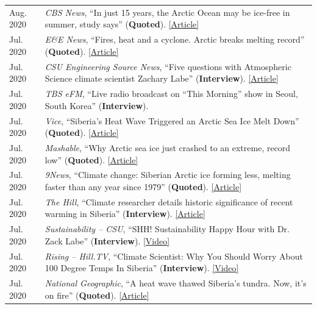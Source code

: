 \documentclass[margin,line,palatino,courier,10pt]{res}
\begin{document}
\begin{resume}
\begin{tabular}{@{}p{0.9in}p{4in}}
Aug. 2020 & \textit{CBS News}, ``In just 15 years, the Arctic Ocean may be ice-free in summer, study says'' (\textbf{Quoted}). \href{https://www.cbsnews.com/news/arctic-ocean-climate-change-ice-free-15-years/}{[Article]}\\
Jul. 2020 & \textit{E\&E News}, ``Fires, heat and a cyclone. Arctic breaks melting record'' (\textbf{Quoted}). \href{https://www.eenews.net/stories/1063658765}{[Article]}\\
Jul. 2020 & \textit{CSU Engineering Source News}, ``Five questions with Atmospheric Science climate scientist Zachary Labe'' (\textbf{Interview}). \href{https://engr.source.colostate.edu/five-questions-with-climate-scientist-zachary-labe/}{[Article]}\\
Jul. 2020 & \textit{TBS eFM}, ``Live radio broadcast on “This Morning” show in Seoul, South Korea'' (\textbf{Interview}).\\
Jul. 2020 & \textit{Vice}, ``Siberia's Heat Wave Triggered an Arctic Sea Ice Melt Down'' (\textbf{Quoted}). \href{https://www.vice.com/en_us/article/ep45be/siberias-heat-wave-triggered-an-arctic-sea-ice-melt-down}{[Article]}\\
Jul. 2020 & \textit{Mashable}, ``Why Arctic sea ice just crashed to an extreme, record low'' (\textbf{Quoted}). \href{https://mashable.com/article/arctic-sea-ice-plummets-2020/}{[Article]}\\
Jul. 2020 & \textit{9News}, ``Climate change: Siberian Arctic ice forming less, melting faster than any year since 1979'' (\textbf{Quoted}). \href{https://www.9news.com.au/world/climate-change-global-warming-siberian-heatwave-arctic-ice-melting-faster-us-research-data/}{[Article]}\\
Jul. 2020 & \textit{The Hill}, ``Climate researcher details historic significance of recent warming in Siberia'' (\textbf{Interview}). \href{https://thehill.com/hilltv/rising/507850-climate-researcher-details-historic-significance-of-recent-warming-in-siberia}{[Article]}\\
Jul. 2020 & \textit{Sustainability -- CSU}, ``SHH! Sustainability Happy Hour with Dr. Zack Labe'' (\textbf{Interview}). \href{https://www.youtube.com/watch?v=E6htTPoeXQ8&feature=youtu.be}{[Video]}\\
Jul. 2020 & \textit{Rising -- Hill.TV}, ``Climate Scientist: Why You Should Worry About 100 Degree Temps In Siberia'' (\textbf{Interview}). \href{https://www.youtube.com/watch?v=fw4fG-_aI28&feature=youtu.be}{[Video]}\\
Jul. 2020 & \textit{National Geographic}, ``A heat wave thawed Siberia’s tundra. Now, it’s on fire'' (\textbf{Quoted}). \href{https://www.nationalgeographic.com/science/2020/07/heat-wave-thawed-siberia-now-on-fire/#close}{[Article]}\\

\end{tabular}
\end{resume}
\end{document}
